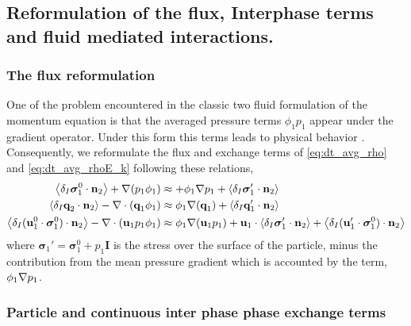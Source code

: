 


\subsection{Reformulation of the flux, Interphase terms and fluid mediated interactions.} 


\subsubsection{The flux reformulation}

One of the problem encountered in the classic two fluid formulation of the momentum equation is that the averaged pressure terms $\phi_1 p_1$  appear under the gradient operator. 
Under this form this terms leads to physical behavior \citet{jackson2000}.
Consequently, we reformulate the flux and exchange terms of \ref{eq:dt_avg_rho} and \ref{eq:dt_avg_rhoE_k} following these relations, 
\begin{align*}
    \left<\delta_I \bm{\sigma}_1^0  \cdot \textbf{n}_2\right> + \mathbf{\nabla} (p_1 \phi_1)
    &\approx 
    + \phi_1 \mathbf{\nabla} p_1
    + \left<\delta_I \bm{\sigma}_1'\cdot \textbf{n}_2\right>
    \\
    \left<\delta_I  \textbf{q}_2 \cdot \textbf{n}_2\right> - \mathbf{\nabla}\cdot (\textbf{q}_1\phi_1)
    &\approx 
    \phi_1 \mathbf{\nabla}(\textbf{q}_1)
    + \left<\delta_I \textbf{q}_1' \cdot \textbf{n}_2\right>\\
    \left<\delta_I (\textbf{u}_1^0 \cdot\bm{\sigma}_1^0 )\cdot \textbf{n}_2\right> - \mathbf{\nabla}\cdot (\textbf{u}_1p_1\phi_1)
    &\approx 
    \phi_1 \mathbf{\nabla}(\textbf{u}_1 p_1)
    + \textbf{u}_1 \cdot \left<\delta_I \bm{\sigma}_1'\cdot \textbf{n}_2\right>
    + \left<\delta_I (\textbf{u}_1' \cdot \bm{\sigma}_1^0 )\cdot \textbf{n}_2\right>
\end{align*}
where $\bm{\sigma}_1' = \bm{\sigma}_1^0 + p_1 \textbf{I}$ is the stress over the surface of the particle, minus the contribution from the mean pressure gradient which is accounted by the term, $\phi_1\mathbf{\nabla} p_1$. 




\subsubsection{Particle and continuous inter phase phase exchange terms}

